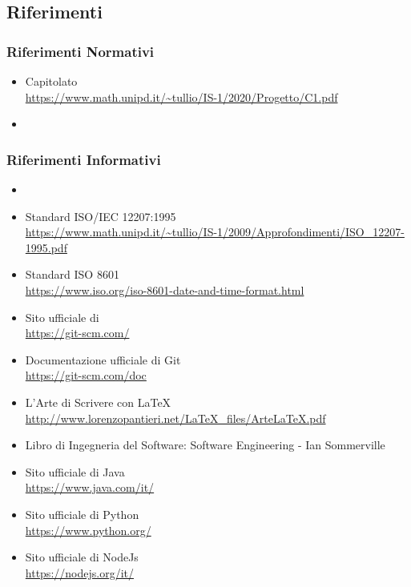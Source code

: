 \subsection{Riferimenti}
\subsubsection{Riferimenti Normativi}
\begin{itemize}
\item{Capitolato \\
\url{https://www.math.unipd.it/~tullio/IS-1/2020/Progetto/C1.pdf}}
\item {}
\end{itemize}

\subsubsection{Riferimenti Informativi}
\begin{itemize}
\item {}
\item{Standard ISO/IEC 12207:1995 \\
\url{https://www.math.unipd.it/~tullio/IS-1/2009/Approfondimenti/ISO_12207-1995.pdf}}
\item{Standard ISO 8601 \\
	\url{https://www.iso.org/iso-8601-date-and-time-format.html}}
\item{Sito ufficiale di  \\
\url{https://git-scm.com/}}
\item{Documentazione ufficiale di Git} \\
\url{https://git-scm.com/doc}
\item{L’Arte di Scrivere con \LaTeX \\
\url{http://www.lorenzopantieri.net/LaTeX_files/ArteLaTeX.pdf}}
\item{Libro di Ingegneria del Software: Software Engineering - Ian Sommerville}
\item{Sito ufficiale di Java} \\
\url{https://www.java.com/it/}
\item{Sito ufficiale di Python} \\
\url{https://www.python.org/}
\item{Sito ufficiale di NodeJs} \\
\url{https://nodejs.org/it/}
\end{itemize}
